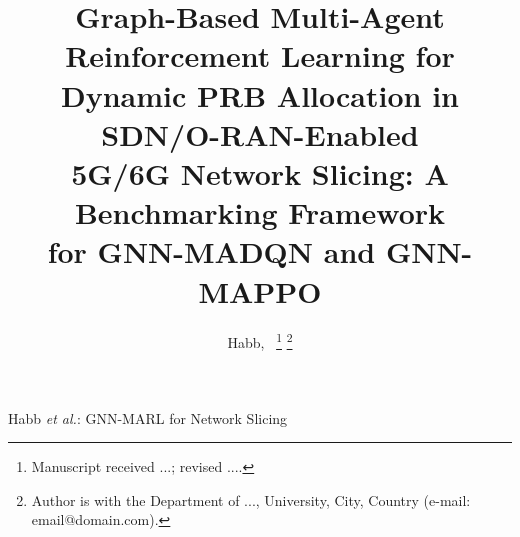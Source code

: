 \documentclass[journal]{IEEEtran}
\begin{document}
\title{Graph-Based Multi-Agent Reinforcement Learning for\\ Dynamic PRB Allocation in SDN/O-RAN-Enabled\\ 5G/6G Network Slicing: A Benchmarking Framework\\ for GNN-MADQN and GNN-MAPPO}

\author{Habb,~%
\thanks{Manuscript received ...; revised ....}%
\thanks{Author is with the Department of ..., University, City, Country (e-mail: email@domain.com).}}

%
{Habb \MakeLowercase{\textit{et al.}}: GNN-MARL for Network Slicing}


\maketitle
\end{document}
